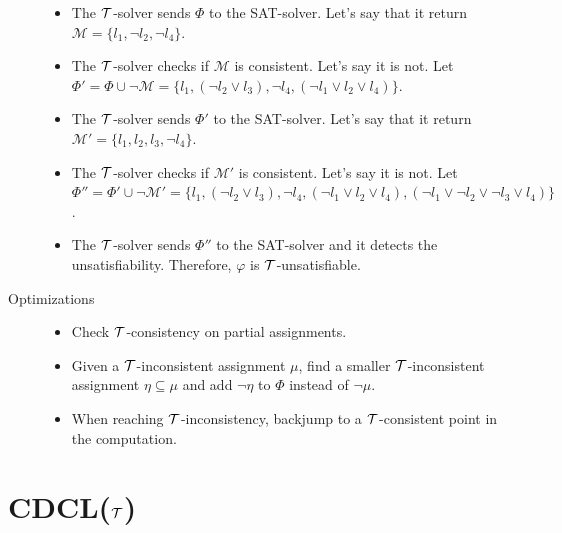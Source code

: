 \begin{description}
\begin{example}
\begin{itemize}
                \item The $\mathcal{T}$-solver sends $\Phi$ to the SAT-solver.
                    Let's say that it return $\mathcal{M} = \{ l_1, \lnot l_2, \lnot l_4 \}$.

                \item The $\mathcal{T}$-solver checks if $\mathcal{M}$ is consistent. Let's say it is not.
                    Let $\Phi' = \Phi \cup \lnot \mathcal{M} = \{ l_1, (\lnot l_2 \vee l_3), \lnot l_4, (\lnot l_1 \vee l_2 \vee l_4) \}$.
                
                \item The $\mathcal{T}$-solver sends $\Phi'$ to the SAT-solver.
                    Let's say that it return $\mathcal{M}' = \{ l_1, l_2, l_3, \lnot l_4 \}$.

                \item The $\mathcal{T}$-solver checks if $\mathcal{M}'$ is consistent. Let's say it is not.
                    Let $\Phi'' = \Phi' \cup \lnot \mathcal{M}' = \{ l_1, (\lnot l_2 \vee l_3), \lnot l_4, (\lnot l_1 \vee l_2 \vee l_4), (\lnot l_1 \vee \lnot l_2 \vee \lnot l_3 \vee l_4) \}$.
                
                \item The $\mathcal{T}$-solver sends $\Phi''$ to the SAT-solver and it detects the unsatisfiability.
                    Therefore, $\varphi$ is $\mathcal{T}$-unsatisfiable.
            \end{itemize}
        \end{example}

    \item[Optimizations] \phantom{}
        \begin{itemize}
            \item Check $\mathcal{T}$-consistency on partial assignments.
            \item Given a $\mathcal{T}$-inconsistent assignment $\mu$, 
                find a smaller $\mathcal{T}$-inconsistent assignment $\eta \subseteq \mu$ and add $\lnot \eta$ to $\Phi$ instead of $\lnot \mu$.
            \item When reaching $\mathcal{T}$-inconsistency, backjump to a $\mathcal{T}$-consistent point in the computation.
        \end{itemize}
\end{description}



\section{CDCL($\mathcal{T}$)}

